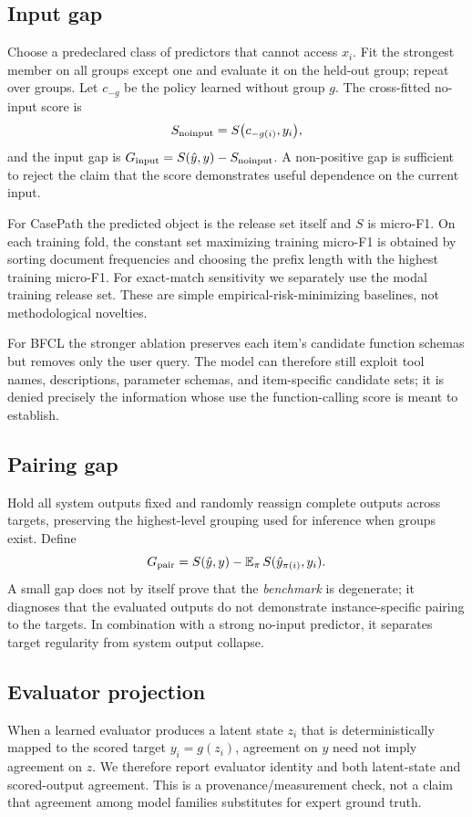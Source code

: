 \documentclass{article}
\begin{document}
\subsection{Input gap}
Choose a predeclared class of predictors that cannot access $x_i$. Fit the strongest member on all groups except one and evaluate it on the held-out group; repeat over groups. Let $c_{-g}$ be the policy learned without group $g$. The cross-fitted no-input score is
\begin{equation}
S_{\rm noinput}=S\bigl(c_{-g(i)},y_i\bigr),
\end{equation}
and the input gap is $G_{\rm input}=S(\hat y,y)-S_{\rm noinput}$. A non-positive gap is sufficient to reject the claim that the score demonstrates useful dependence on the current input.

For CasePath the predicted object is the release set itself and $S$ is micro-F1. On each training fold, the constant set maximizing training micro-F1 is obtained by sorting document frequencies and choosing the prefix length with the highest training micro-F1. For exact-match sensitivity we separately use the modal training release set. These are simple empirical-risk-minimizing baselines, not methodological novelties.

For BFCL the stronger ablation preserves each item's candidate function schemas but removes only the user query. The model can therefore still exploit tool names, descriptions, parameter schemas, and item-specific candidate sets; it is denied precisely the information whose use the function-calling score is meant to establish.

\subsection{Pairing gap}
Hold all system outputs fixed and randomly reassign complete outputs across targets, preserving the highest-level grouping used for inference when groups exist. Define
\begin{equation}
G_{\rm pair}=S(\hat y,y)-\mathbb{E}_{\pi}\,S(\hat y_{\pi(i)},y_i).
\end{equation}
A small gap does not by itself prove that the \emph{benchmark} is degenerate; it diagnoses that the evaluated outputs do not demonstrate instance-specific pairing to the targets. In combination with a strong no-input predictor, it separates target regularity from system output collapse.

\subsection{Evaluator projection}
When a learned evaluator produces a latent state $z_i$ that is deterministically mapped to the scored target $y_i=g(z_i)$, agreement on $y$ need not imply agreement on $z$. We therefore report evaluator identity and both latent-state and scored-output agreement. This is a provenance/measurement check, not a claim that agreement among model families substitutes for expert ground truth.
\end{document}
